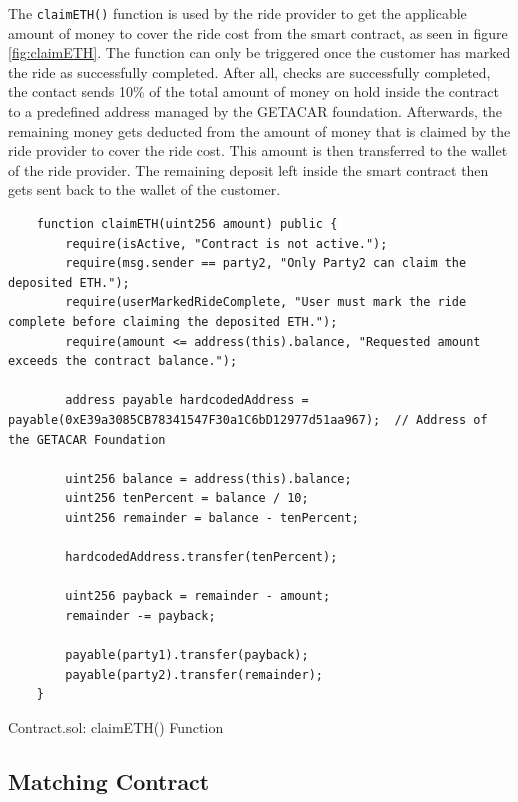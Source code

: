 The \texttt{claimETH()} function is used by the ride provider to get the applicable amount of money to cover the ride cost from the smart contract, as seen in figure \ref{fig:claimETH}. The function can only be triggered once the customer has marked the ride as successfully completed. After all, checks are successfully completed, the contact sends 10\% of the total amount of money on hold inside the contract to a predefined address managed by the GETACAR foundation. Afterwards, the remaining money gets deducted from the amount of money that is claimed by the ride provider to cover the ride cost. This amount is then transferred to the wallet of the ride provider. The remaining deposit left inside the smart contract then gets sent back to the wallet of the customer. 

\lstset{
  basicstyle=\footnotesize\ttfamily,
  breaklines=true,
  numbers=left,
  firstnumber=232
}

\begin{Listing}
\begin{lstlisting}
    function claimETH(uint256 amount) public {
        require(isActive, "Contract is not active.");
        require(msg.sender == party2, "Only Party2 can claim the deposited ETH.");
        require(userMarkedRideComplete, "User must mark the ride complete before claiming the deposited ETH.");
        require(amount <= address(this).balance, "Requested amount exceeds the contract balance.");
        
        address payable hardcodedAddress = payable(0xE39a3085CB78341547F30a1C6bD12977d51aa967);  // Address of the GETACAR Foundation

        uint256 balance = address(this).balance;
        uint256 tenPercent = balance / 10;
        uint256 remainder = balance - tenPercent;

        hardcodedAddress.transfer(tenPercent);

        uint256 payback = remainder - amount;
        remainder -= payback;

        payable(party1).transfer(payback);
        payable(party2).transfer(remainder);
    }
\end{lstlisting}
  \caption{Contract.sol: claimETH() Function}
  \label{lst:claimETH}
\end{Listing}


\subsection{Matching Contract}

